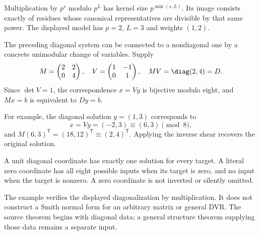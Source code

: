 Multiplication by $p^s$ modulo $p^L$ has kernel size $p^{\min(s,L)}$. Its image consists exactly of residues whose canonical representatives are divisible by that same power. The displayed model has $p=2$, $L=3$ and weights $(1,2)$.


The preceding diagonal system can be connected to a nondiagonal one by a concrete unimodular change of variables. Supply
\[
M=\begin{pmatrix}2&2\\0&4\end{pmatrix},\quad
V=\begin{pmatrix}1&-1\\0&1\end{pmatrix},\quad
MV=\diag(2,4)=D.
\]
Since $\det V=1$, the correspondence $x=Vy$ is bijective modulo eight, and $Mx=b$ is equivalent to $Dy=b$.


For example, the diagonal solution $y=(1,3)$ corresponds to
\[
x=Vy=(-2,3)\equiv(6,3)\pmod8,
\]
and $M(6,3)^\mathsf T=(18,12)^\mathsf T\equiv(2,4)^\mathsf T$. Applying the inverse shear recovers the original solution.

A unit diagonal coordinate has exactly one solution for every target. A literal zero coordinate has all eight possible inputs when its target is zero, and no input when the target is nonzero. A zero coordinate is not inverted or silently omitted.

The example verifies the displayed diagonalization by multiplication. It does not construct a Smith normal form for an arbitrary matrix or general DVR. The source theorem begins with diagonal data; a general structure theorem supplying those data remains a separate input.


